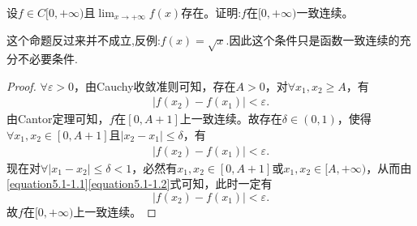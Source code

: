 \documentclass[../../main.tex]{subfiles}%
\begin{document}
\begin{proposition}\label{proposition一致连续的充分不必要条件}
设\(f\in C[0,+\infty)\)且\(\lim_{x\rightarrow +\infty}f(x)\)存在。证明:\(f\)在\([0,+\infty)\)一致连续。
\end{proposition}
\begin{remark}
这个命题反过来并不成立,反例:$f(x)=\sqrt{x}$.因此这个条件只是函数一致连续的充分不必要条件.
\end{remark}
\begin{proof}
\(\forall \varepsilon > 0\)，由Cauchy收敛准则可知，存在\(A > 0\)，对\(\forall x_1, x_2 \geqslant A\)，有
\begin{align}
\left| f(x_2) - f(x_1) \right| < \varepsilon.  \label{equation5.1-1.1}
\end{align}
由Cantor定理可知，\(f\)在\([0, A + 1]\)上一致连续。故存在\(\delta \in (0, 1)\)，使得\(\forall x_1, x_2 \in [0, A + 1]\)且\(\left| x_2 - x_1 \right| \leqslant \delta\)，有
\begin{align}
\left| f(x_2) - f(x_1) \right| < \varepsilon.\label{equation5.1-1.2}
\end{align}
现在对\(\forall \left| x_1 - x_2 \right| \leqslant \delta < 1\)，必然有\(x_1, x_2 \in [0, A + 1]\)或\(x_1, x_2 \in [A, +\infty)\)，从而由\eqref{equation5.1-1.1}\eqref{equation5.1-1.2}式可知，此时一定有
\[
\left| f(x_2) - f(x_1) \right| < \varepsilon.
\]
故\(f\)在\([0, +\infty)\)上一致连续。
\end{proof}
\end{document}
